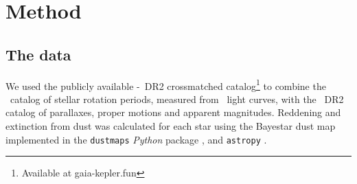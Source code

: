 
\section{Method}
\label{sec:method}

\subsection{The data}
\label{sec:the_data}

We used the publicly available \kepler-\gaia\ DR2 crossmatched
catalog\footnote{Available at gaia-kepler.fun} to combine the \mct\ catalog of
stellar rotation periods, measured from \kepler\ light curves, with the \gaia\
DR2 catalog of parallaxes, proper motions and apparent magnitudes.
Reddening and extinction from dust was calculated for each star using the
Bayestar dust map implemented in the {\tt dustmaps} {\it Python} package
\citep{green2018}, and {\tt astropy} \citep{astropy2013}.

